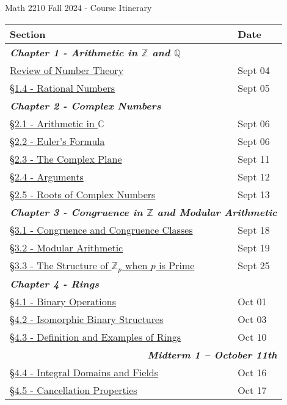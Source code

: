 \documentclass{article}
\newcommand{\chaptercolor}{RoyalBlue!35}
\newcommand{\testcolor}{Bittersweet!25}
\begin{document}
\large
\begin{center}
{\Huge Math 2210 Fall 2024 - Course Itinerary}
\vspace{0.25cm}

\begin{tabular}{|l|l|}
\cellcolor{black!85}\color{white}Section & \cellcolor{black!85}\color{white}Date\\
%
\hline
%
\multicolumn{2}{|l|}{\cellcolor{\chaptercolor} \textit{\textbf{Chapter 1 - Arithmetic in $\mathbb{Z}$ and $\mathbb{Q}$}}}\\
\hline
\href{}{Review of Number Theory\phantom{--------------------------------------------------------}} & Sept 04\\
\href{}{\S1.4 - Rational Numbers} & Sept 05\\
\hline
\multicolumn{2}{|l|}{\cellcolor{\chaptercolor} \textit{\textbf{Chapter 2 - Complex Numbers}}}\\
\hline
\href{}{\S2.1 - Arithmetic in $\mathbb{C}$} & Sept 06\\
\href{}{\S2.2 - Euler's Formula} & Sept 06\\
\href{}{\S2.3 - The Complex Plane} & Sept 11\\
\href{}{\S2.4 - Arguments} & Sept 12\\
\href{}{\S2.5 - Roots of Complex Numbers} & Sept 13\\
\hline
\multicolumn{2}{|l|}{\cellcolor{\chaptercolor} \textit{\textbf{Chapter 3 - Congruence in $\mathbb{Z}$ and Modular Arithmetic}}}\\
\hline
\href{}{\S3.1 - Congruence and Congruence Classes} & Sept 18\\
\href{}{\S3.2 - Modular Arithmetic} & Sept 19\\
\href{}{\S3.3 - The Structure of $\mathbb{Z}_{p}$ when $p$ is Prime} & Sept 25\\
\hline
\multicolumn{2}{|l|}{\cellcolor{\chaptercolor} \textit{\textbf{Chapter 4 - Rings}}}\\
\hline
\href{}{\S4.1 - Binary Operations} & Oct 01\\
\href{}{\S4.2 - Isomorphic Binary Structures} & Oct 03\\
\href{}{\S4.3 - Definition and Examples of Rings} & Oct 10\\
\hline
\multicolumn{2}{|r|}{\cellcolor{\testcolor} \textit{\textbf{Midterm 1 -- October 11th}}}\\
\hline
\href{}{\S4.4 - Integral Domains and Fields} & Oct 16\\
\href{}{\S4.5 - Cancellation Properties} & Oct 17\\

\end{tabular}
\end{center}
\end{document}
